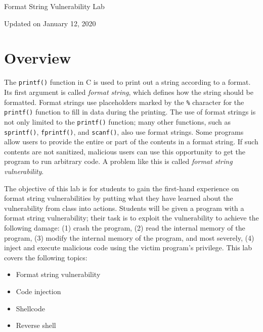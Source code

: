 



\newcommand{\formatFigs}{./Figs}






\begin{center}
{\LARGE Format String Vulnerability Lab}

\vspace{0.05in}
Updated on January 12, 2020
\end{center}




\section{Overview}


The \texttt{printf()} function in C is used to print out a string according to a format.  Its
first argument is called \textit{format string}, which defines how the string should be
formatted. Format strings use placeholders marked by the \texttt{\%} character for the
\texttt{printf()} function to fill in data during the printing.  The use of format strings is
not only limited to the \texttt{printf()} function; many other functions, such as
\texttt{sprintf()}, \texttt{fprintf()}, and \texttt{scanf()}, also use format strings. Some
programs allow users to provide the entire or part of the contents in a format string. If such
contents are not sanitized, malicious users can use this opportunity to get the program to run
arbitrary code. A problem like this is called \textit{format string vulnerability}.


The objective of this lab is for students to gain the first-hand
experience on format string vulnerabilities by putting what they have learned 
about the vulnerability from class into actions. 
Students will be given a program with a format string
vulnerability; their task is to exploit
the vulnerability to achieve the following damage: (1) crash the 
program, (2) read the internal memory of the program, (3) modify
the internal memory of the program, and most severely, 
(4) inject and execute malicious code using the victim program's privilege. 
This lab covers the following topics:

\begin{itemize}[noitemsep]
\item Format string vulnerability
\item Code injection
\item Shellcode 
\item Reverse shell 
\end{itemize}


